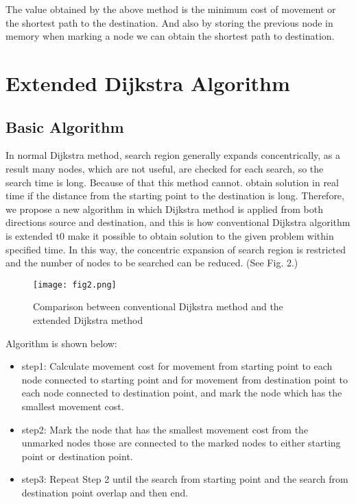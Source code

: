 \documentclass[conference]{IEEEtran}
\begin{document}
The value obtained by the above method is the minimum cost of movement or the shortest path to the destination. And also by storing the previous
node in memory when marking a node we can obtain the shortest path to destination. 


\section{Extended Dijkstra Algorithm }

\subsection{Basic Algorithm}
In normal Dijkstra method, search region generally expands concentrically, as a result many nodes, which are not useful, are checked for each search, so the search time is long.
Because of that this method cannot. obtain solution in real time if the distance from the starting point to the destination is long. Therefore, we propose a new algorithm
in which Dijkstra method is applied from both directions source and destination, and
this is how conventional Dijkstra algorithm is extended t0 make
it possible to obtain solution to the given problem
within specified time. In this way, the concentric
expansion of search region is restricted and the
number of nodes to be searched can be reduced. (See
Fig. 2.) 

\begin{figure}[htbp]
\centerline{\texttt{[image: fig2.png]}}
\caption{Comparison between conventional Dijkstra
method and the extended Dijkstra method}
\label{fig}
\end{figure}

Algorithm is shown below:

\begin{itemize}
    \item step1: Calculate movement cost for movement from starting point to each node connected to starting point and for movement
from destination point to each node connected to destination point, and mark the node which has the smallest movement cost.
    \item step2: Mark the node that has the smallest
movement cost from the unmarked nodes those are
connected to the marked nodes to either starting point or destination point.
    \item step3: Repeat Step 2 until the search from
starting point and the search from destination point
overlap and then end. 
\end{itemize}
\end{document}
